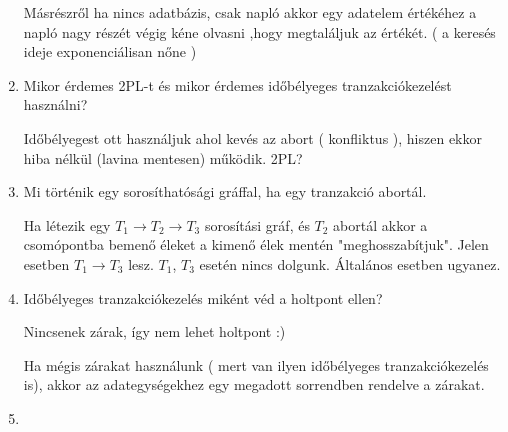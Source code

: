 \begin{enumerate}
		Másrészről ha nincs adatbázis, csak napló akkor egy adatelem értékéhez a napló nagy részét végig kéne olvasni ,hogy megtaláljuk az értékét. ( a keresés ideje exponenciálisan nőne )

		\item Mikor érdemes 2PL-t és mikor érdemes időbélyeges tranzakciókezelést használni?

		Időbélyegest ott használjuk ahol kevés az abort ( konfliktus ), hiszen ekkor hiba nélkül (lavina mentesen) működik.
		2PL?

		\item Mi történik egy sorosíthatósági gráffal, ha egy tranzakció abortál.

		Ha létezik egy $T_1 \rightarrow T_2 \rightarrow T_3$ sorosítási gráf, és $T_2$ abortál akkor a csomópontba bemenő éleket a kimenő élek mentén "meghosszabítjuk". Jelen esetben $T_1 \rightarrow T_3$ lesz. $T_1$, $T_3$ esetén nincs dolgunk. Általános esetben ugyanez.

		\item Időbélyeges tranzakciókezelés miként véd a holtpont ellen?

		Nincsenek zárak, így nem lehet holtpont :)

		Ha mégis zárakat használunk ( mert van ilyen időbélyeges tranzakciókezelés is), akkor az adategységekhez egy megadott sorrendben rendelve a zárakat.

		\item

	\end{enumerate}
